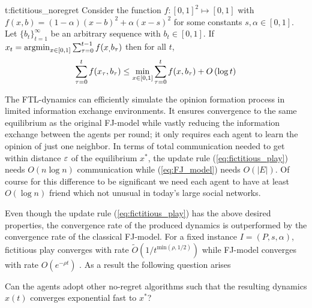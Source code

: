 \begin{reptheorem}{t:fictitious_noregret}
  Consider the function $f:[0,1]^2 \mapsto [0,1]$ with
  $f(x,b) = (1-\alpha)(x-b)^2 + \alpha(x-s)^2$ for some
  constants $s,\alpha \in [0,1]$.
  Let $\{b_t\}_{t=1}^\infty$ be an arbitrary sequence with
  $b_t \in [0,1]$. If $x_t = \operatorname*{argmin}_{x \in [0,1]}\sum_{\tau=0}^{t-1}f(x_,b_\tau)$
  then for all $t$,
  \[
    \sum_{\tau=0}^{t}f(x_\tau,b_\tau) \leq
    \min_{x \in [0,1]}\sum_{\tau=0}^tf(x,b_\tau) + O\left(\log t\right)
  \]
\end{reptheorem}
The FTL-dynamics can efficiently simulate the opinion formation
process in limited information exchange environments.  It ensures
convergence to the same equilibrium as the original FJ-model
while vastly reducing the information exchange between the agents
per round; it only requires each agent to learn the opinion
of just one neighbor.
In terms of total communication needed to get within distance $\varepsilon$ of the
equilibrium $x^*$, the update rule (\ref{eq:fictitious_play}) needs
$O(n \log n)$ communication while (\ref{eq:FJ_model}) needs
$O(|E|)$.
Of course for this difference to be significant we need
each agent to have at least $O(\log n)$ friend which
not unusual in today's large social networks.

Even though the update rule (\ref{eq:fictitious_play}) has the above
desired properties, the convergence rate of the produced dynamics is
outperformed by the convergence rate of the classical FJ-model. For
a fixed instance $I=(P,s,\alpha)$, fictitious play converges with rate
$\widetilde{O}(1/t^{\text{min}(\rho,1/2)})$ while FJ-model
converges with rate $O(e^{-\rho t})$ \cite{GS14}.
As a result the following question arises
\begin{question}
  Can the agents adopt other no-regret algorithms such that the resulting
  dynamics $x(t)$ converges exponential fast to $x^*$?
\end{question}

